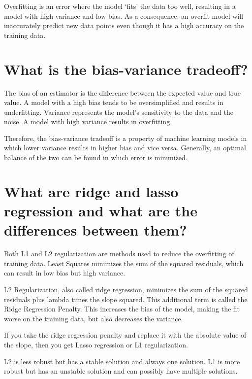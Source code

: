 \documentclass[
]{book}
\begin{document}
Overfitting is an error where the model `fits' the data too well, resulting in a model with high variance and low bias. As a consequence, an overfit model will inaccurately predict new data points even though it has a high accuracy on the training data.

\hypertarget{what-is-the-bias-variance-tradeoff}{%
\section{What is the bias-variance tradeoff?}\label{what-is-the-bias-variance-tradeoff}}

The bias of an estimator is the difference between the expected value and true value. A model with a high bias tends to be oversimplified and results in underfitting. Variance represents the model's sensitivity to the data and the noise. A model with high variance results in overfitting.

Therefore, the bias-variance tradeoff is a property of machine learning models in which lower variance results in higher bias and vice versa. Generally, an optimal balance of the two can be found in which error is minimized.

\hypertarget{what-are-ridge-and-lasso-regression-and-what-are-the-differences-between-them}{%
\section{What are ridge and lasso regression and what are the differences between them?}\label{what-are-ridge-and-lasso-regression-and-what-are-the-differences-between-them}}

Both L1 and L2 regularization are methods used to reduce the overfitting of training data. Least Squares minimizes the sum of the squared residuals, which can result in low bias but high variance.

L2 Regularization, also called ridge regression, minimizes the sum of the squared residuals plus lambda times the slope squared. This additional term is called the Ridge Regression Penalty. This increases the bias of the model, making the fit worse on the training data, but also decreases the variance.

If you take the ridge regression penalty and replace it with the absolute value of the slope, then you get Lasso regression or L1 regularization.

L2 is less robust but has a stable solution and always one solution. L1 is more robust but has an unstable solution and can possibly have multiple solutions.
\end{document}

